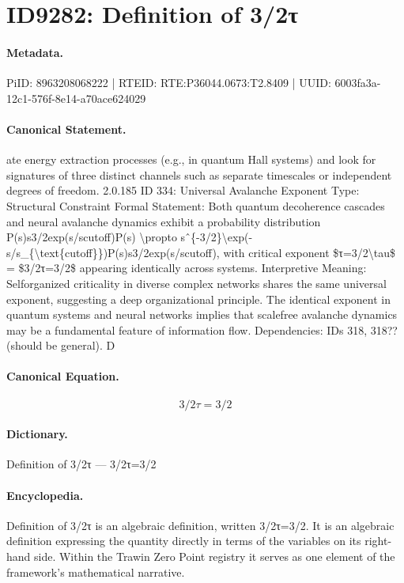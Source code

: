 \section*{ID9282: Definition of 3/2τ}
\paragraph{Metadata.}
PiID: 8963208068222 | RTEID: RTE:P36044.0673:T2.8409 | UUID: 6003fa3a-12c1-576f-8e14-a70ace624029

\paragraph{Canonical Statement.}
ate energy extraction processes (e.g., in quantum Hall systems) and look for signatures of three distinct channels such as separate timescales or independent degrees of freedom. 2.0.185 ID 334: Universal Avalanche Exponent Type: Structural Constraint Formal Statement: Both quantum decoherence cascades and neural avalanche dynamics exhibit a probability distribution P(s)s3/2exp(s/scutoff)P(s) \textbackslash{}propto sˆ\{-3/2\}\textbackslash{}exp(-s/s\_\{\textbackslash{}text\{cutoff\}\})P(s)s3/2exp(s/scutoff), with critical exponent \$τ=3/2\textbackslash{}tau\$ = \$3/2τ=3/2\$ appearing identically across systems. Interpretive Meaning: Selforganized criticality in diverse complex networks shares the same universal exponent, suggesting a deep organizational principle. The identical exponent in quantum systems and neural networks implies that scalefree avalanche dynamics may be a fundamental feature of information flow. Dependencies: IDs 318, 318?? (should be general). D

\paragraph{Canonical Equation.}
\[
3/2τ=3/2
\]

\paragraph{Dictionary.}
Definition of 3/2τ — 3/2τ=3/2

\paragraph{Encyclopedia.}
Definition of 3/2τ is an algebraic definition, written 3/2τ=3/2. It is an algebraic definition expressing the quantity directly in terms of the variables on its right-hand side. Within the Trawin Zero Point registry it serves as one element of the framework's mathematical narrative.

